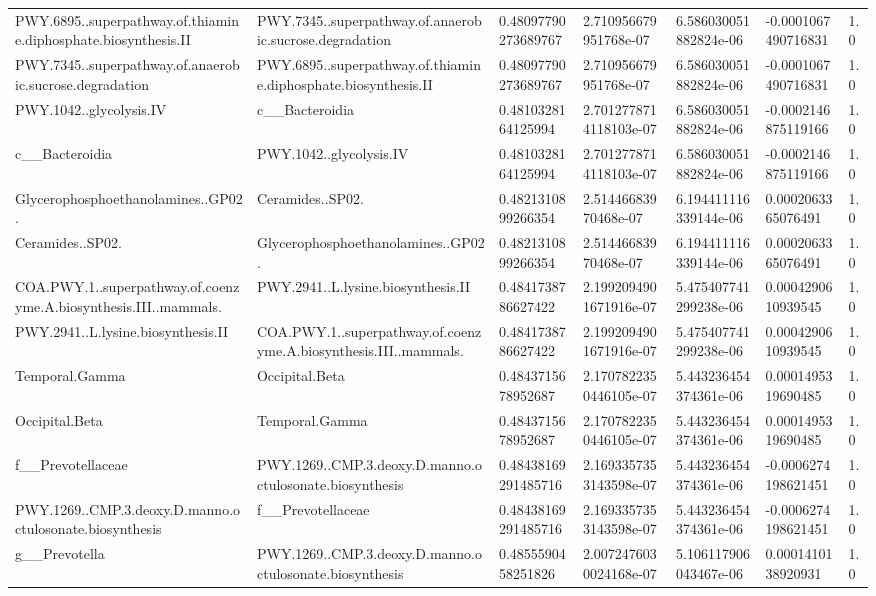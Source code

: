 \begin{longtable}{lllllll}
PWY.6895..superpathway.of.thiamine.diphosphate.biosynthesis.II & PWY.7345..superpathway.of.anaerobic.sucrose.degradation & 0.48097790273689767 & 2.710956679951768e-07 & 6.586030051882824e-06 & -0.0001067490716831 & 1.0 \\
PWY.7345..superpathway.of.anaerobic.sucrose.degradation & PWY.6895..superpathway.of.thiamine.diphosphate.biosynthesis.II & 0.48097790273689767 & 2.710956679951768e-07 & 6.586030051882824e-06 & -0.0001067490716831 & 1.0 \\
PWY.1042..glycolysis.IV & c\_\_Bacteroidia & 0.4810328164125994 & 2.7012778714118103e-07 & 6.586030051882824e-06 & -0.0002146875119166 & 1.0 \\
c\_\_Bacteroidia & PWY.1042..glycolysis.IV & 0.4810328164125994 & 2.7012778714118103e-07 & 6.586030051882824e-06 & -0.0002146875119166 & 1.0 \\
Glycerophosphoethanolamines..GP02. & Ceramides..SP02. & 0.4821310899266354 & 2.51446683970468e-07 & 6.194411116339144e-06 & 0.0002063365076491 & 1.0 \\
Ceramides..SP02. & Glycerophosphoethanolamines..GP02. & 0.4821310899266354 & 2.51446683970468e-07 & 6.194411116339144e-06 & 0.0002063365076491 & 1.0 \\
COA.PWY.1..superpathway.of.coenzyme.A.biosynthesis.III..mammals. & PWY.2941..L.lysine.biosynthesis.II & 0.4841738786627422 & 2.1992094901671916e-07 & 5.475407741299238e-06 & 0.0004290610939545 & 1.0 \\
PWY.2941..L.lysine.biosynthesis.II & COA.PWY.1..superpathway.of.coenzyme.A.biosynthesis.III..mammals. & 0.4841738786627422 & 2.1992094901671916e-07 & 5.475407741299238e-06 & 0.0004290610939545 & 1.0 \\
Temporal.Gamma & Occipital.Beta & 0.4843715678952687 & 2.1707822350446105e-07 & 5.443236454374361e-06 & 0.0001495319690485 & 1.0 \\
Occipital.Beta & Temporal.Gamma & 0.4843715678952687 & 2.1707822350446105e-07 & 5.443236454374361e-06 & 0.0001495319690485 & 1.0 \\
f\_\_Prevotellaceae & PWY.1269..CMP.3.deoxy.D.manno.octulosonate.biosynthesis & 0.48438169291485716 & 2.1693357353143598e-07 & 5.443236454374361e-06 & -0.0006274198621451 & 1.0 \\
PWY.1269..CMP.3.deoxy.D.manno.octulosonate.biosynthesis & f\_\_Prevotellaceae & 0.48438169291485716 & 2.1693357353143598e-07 & 5.443236454374361e-06 & -0.0006274198621451 & 1.0 \\
g\_\_Prevotella & PWY.1269..CMP.3.deoxy.D.manno.octulosonate.biosynthesis & 0.4855590458251826 & 2.0072476030024168e-07 & 5.106117906043467e-06 & 0.0001410138920931 & 1.0 \\

\end{longtable}
